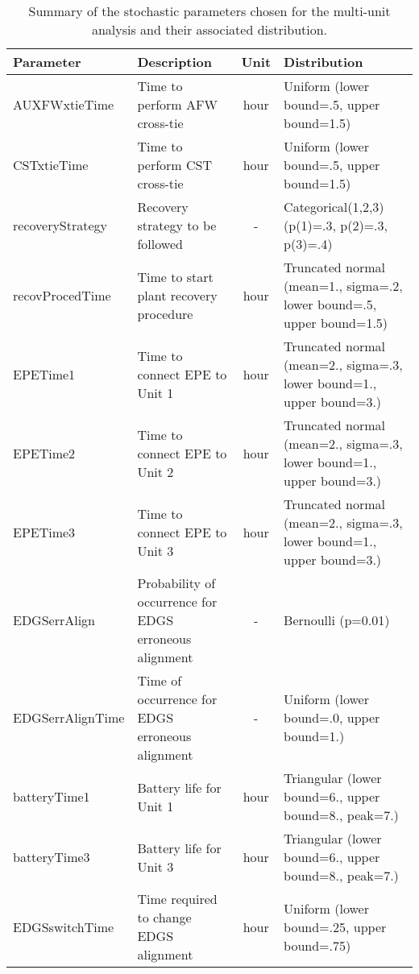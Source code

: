 \begin{table}
  \centering
  \begin{center}
      \begin{tabular}{ | l | p{5cm} | c | p{5cm} |}
        \hline
         \textbf{Parameter}          & \textbf{Description}                      & \textbf{Unit}   & \textbf{Distribution}                                         \\ \hline \hline
         AUXFWxtieTime      & Time to perform AFW cross-tie    & hour   & Uniform (lower bound=.5, upper bound=1.5)            \\ \hline
         CSTxtieTime        & Time to perform CST cross-tie    & hour   & Uniform (lower bound=.5, upper bound=1.5)            \\ \hline
         recoveryStrategy   & Recovery strategy to be followed & -      & Categorical(1,2,3) (p(1)=.3, p(2)=.3, p(3)=.4)       \\ \hline
         recovProcedTime    & Time to start plant recovery procedure    & hour        & Truncated normal (mean=1., sigma=.2, lower bound=.5, upper bound=1.5)       \\ \hline
         EPETime1           & Time to connect EPE to Unit 1    & hour   & Truncated normal (mean=2., sigma=.3, lower bound=1., upper bound=3.)   \\ \hline
         EPETime2           & Time to connect EPE to Unit 2    & hour   & Truncated normal (mean=2., sigma=.3, lower bound=1., upper bound=3.)   \\ \hline
         EPETime3           & Time to connect EPE to Unit 3    & hour   & Truncated normal (mean=2., sigma=.3, lower bound=1., upper bound=3.)   \\ \hline
         EDGSerrAlign     & Probability of occurrence for EDGS erroneous alignment & -      & Bernoulli (p=0.01)                               \\ \hline
         EDGSerrAlignTime & Time of occurrence for EDGS erroneous alignment        & -      & Uniform (lower bound=.0, upper bound=1.)       \\ \hline
         batteryTime1       & Battery life for Unit 1          & hour      & Triangular (lower bound=6., upper bound=8., peak=7.) \\ \hline
         batteryTime3       & Battery life for Unit 3          & hour      & Triangular (lower bound=6., upper bound=8., peak=7.) \\ \hline
         EDGSswitchTime     & Time required to change EDGS alignment       & hour  & Uniform (lower bound=.25, upper bound=.75)                  \\ 
        \hline
      \end{tabular}
  \end{center}
  \caption{Summary of the stochastic parameters chosen for the multi-unit analysis and their associated distribution.}
  \label{tab:stochasticParameters1}
\end{table}
